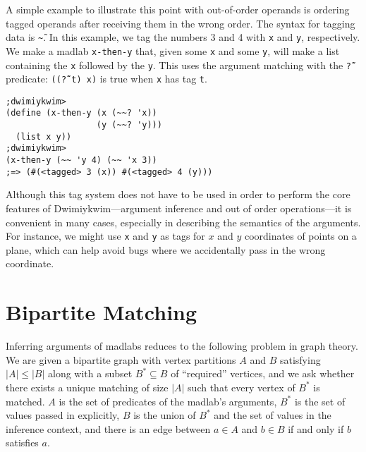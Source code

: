 \documentclass[11pt]{article}
\begin{document}
A simple example to illustrate this point with out-of-order operands
is ordering tagged operands after receiving them in the wrong order.
The syntax for tagging data is \texttt{\~\~}.
In this example, we tag the numbers 3 and 4 with \texttt{x} and \texttt{y},
respectively.
We make a madlab \texttt{x-then-y} that,
given some \texttt{x} and some \texttt{y},
will make a list containing the \texttt{x} followed by the \texttt{y}.
This uses the argument matching with the \texttt{\~\~?} predicate:
\texttt{((\~\~? t) x)} is true when \texttt{x} has tag \texttt{t}.
\begin{Verbatim}
;dwimiykwim>
(define (x-then-y (x (~~? 'x))
                  (y (~~? 'y)))
  (list x y))
;dwimiykwim>
(x-then-y (~~ 'y 4) (~~ 'x 3))
;=> (#(<tagged> 3 (x)) #(<tagged> 4 (y)))
\end{Verbatim}
Although this tag system does not have to be used in order to perform
the core features of Dwimiykwim---argument inference
and out of order operations---it is convenient
in many cases, especially in describing the semantics of the arguments.
For instance, we might use \texttt{x} and \texttt{y} as tags for
$x$ and $y$ coordinates of points on a plane,
which can help avoid bugs where we accidentally pass in the wrong coordinate.


\section{Bipartite Matching}\label{bipartite}

Inferring arguments of madlabs
reduces to the following problem in graph theory.
We are given a bipartite graph with vertex partitions $A$ and $B$
satisfying $|A| \leq |B|$
along with a subset $B^* \subseteq B$ of ``required'' vertices,
and we ask whether there exists a unique matching of size $|A|$
such that every vertex of $B^*$ is matched.
$A$ is the set of predicates of the madlab's arguments,
$B^*$ is the set of values passed in explicitly,
$B$ is the union of $B^*$ and the set of values in the inference context,
and there is an edge between $a \in A$ and $b \in B$
if and only if $b$ satisfies $a$.
\end{document}
